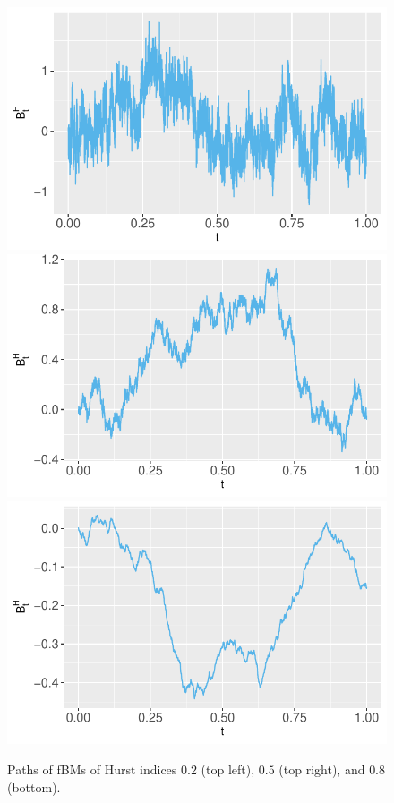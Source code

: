 \begin{figure}[htp]

\centering
\includegraphics[scale=0.58]{fig/img/fBM paths/fBM1,H0.2.pdf}\hfill
\includegraphics[scale=0.59]{fig/img/fBM paths/fBM2,H0.5.pdf}\hfill
\includegraphics[scale=0.6]{fig/img/fBM paths/fBM3,H0.8.pdf}

\caption{Paths of fBMs of Hurst indices $0.2$ (top left), $0.5$ (top right), and $0.8$ (bottom).}
\label{fig:figure3}

\end{figure}
